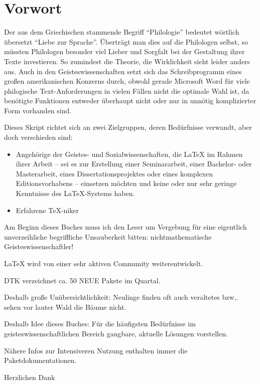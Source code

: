 \chapter{Vorwort}

Der aus dem Griechischen stammende Begriff \enquote{Philologie} bedeutet wörtlich übersetzt \enquote{Liebe zur Sprache}. Überträgt man dies auf die Philologen selbst, so müssten Philologen besonder viel Lieber und Sorgfalt bei der Gestaltung ihrer Texte investieren. So zumindest die Theorie, die Wirklichkeit sieht leider anders aus. Auch in den Geisteswissenschaften setzt sich das Schreibprogramm eines großen amerikanischen Konzerns durch, obwohl gerade Microsoft Word für viele philogische Text-Anforderungen in vielen Fällen nicht die optimale Wahl ist, da benötigte Funktionen entweder überhaupt nicht oder nur in unnötig komplizierter Form vorhanden sind. 

Dieses Skript richtet sich an zwei Zielgruppen, deren Bedürfnisse verwandt, aber doch verschieden sind:

\begin{itemize}
 \item Angehörige der Geistes- und Sozialwissenschaften, die \LaTeX{} im Rahmen ihrer Arbeit
 -- sei es zur Erstellung einer Seminararbeit, einer Bachelor- oder Masterarbeit, eines
 Dissertationsprojektes oder eines komplexen Editionsvorhabens --
 einsetzen möchten und keine oder nur sehr geringe Kenntnisse des \LaTeX{}-Systems haben.
 \item Erfahrene \TeX-niker
\end{itemize}

Am Beginn dieses Buches muss ich den Leser um Vergebung für eine eigentlich unverzeihliche begriffliche
Unsauberkeit bitten: nichtmathematische Geisteswissenschaftler!

\LaTeX{} wird von einer sehr aktiven Community weiterentwickelt.

DTK verzeichnet ca. 50 NEUE Pakete im Quartal.

Deshalb große Unübersichtlichkeit: Neulinge finden oft auch veraltetes bzw,. sehen vor lauter
Wald die Bäume nicht.

Deshalb Idee dieses Buches: Für die häufigsten Bedürfnisse im geisteswissenschaftlichen
Bereich gangbare, aktuelle Lösungen vorstellen.

Nähere Infos zur Intensiveren Nutzung enthalten immer die Paketdokumentationen.

Herzlichen Dank 
\endinput
